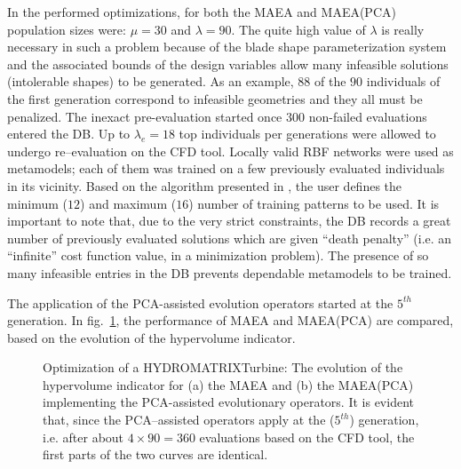 In the performed optimizations, for both the MAEA and MAEA(PCA) population sizes were: $\mu\!=\!30$ and $\lambda\!=\!90$. The quite high value of $\lambda$ is really necessary in such a problem because of the blade shape parameterization system and the associated bounds of the design variables allow many infeasible solutions  (intolerable shapes) to be generated. As an example, $88$ of the $90$ individuals of the first generation correspond to infeasible geometries and they all must be penalized. The inexact pre-evaluation started once $300$ non-failed evaluations entered the DB. Up to $\lambda_e\!=\!18$ top individuals per generations were allowed to undergo re--evaluation on the CFD tool. Locally valid RBF networks were used as metamodels; each of them was trained on a few previously evaluated individuals in its vicinity. Based on the algorithm presented in \cite{LTT_2_029}, the user defines the minimum ($12$) and maximum ($16$) number of training patterns to be used. It is important to note that, due to the very strict constraints, the DB records a great number of previously evaluated solutions which are given ``death penalty'' (i.e. an ``infinite'' cost function value, in a minimization problem). The presence of so many infeasible entries in the DB prevents dependable metamodels to be trained.

The application of the PCA-assisted evolution operators started at the $5^{th}$ generation. In fig.~\ref{hyp_matrix}, the performance of MAEA and MAEA(PCA) are compared, based on the evolution of the hypervolume indicator.


\begin{figure}[h!]
\begin{minipage}[b]{1\linewidth}
 \centering
\end{minipage}
\caption{Optimization of a HYDROMATRIX\circledR Turbine: The evolution of the hypervolume indicator for (a) the MAEA and (b) the MAEA(PCA) implementing the PCA-assisted evolutionary operators. It is evident that, since the PCA--assisted operators apply at the ($5^{th}$) generation, i.e. after about $4\!\times\!90\!=\!360$ evaluations based on the CFD tool, the first parts of the two curves are identical.}
\label{hyp_matrix}
\end{figure}
 
